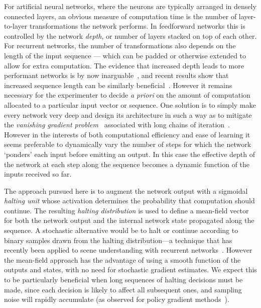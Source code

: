 \documentclass[10pt]{article}
\begin{document}
For artificial neural networks, where the neurons are typically arranged in densely connected layers, an obvious measure of computation time is the number of layer-to-layer transformations the network performs.
In feedforward networks this is controlled by the network \emph{depth}, or number of layers stacked on top of each other.
For recurrent networks, the number of transformations also depends on the length of the input sequence --- which can be padded or otherwise extended to allow for extra computation.
The evidence that increased depth leads to more performant networks is by now inarguable~\cite{dahl2012speech,ciresan2012multicolumn,krizhevsky2012imagenet,graves2013speech}, and recent results show that increased sequence length can be similarly beneficial~\cite{sukhbaatar2015end,vinyals2015order,reed2015npi}.
However it remains necessary for the experimenter to decide \emph{a priori} on the amount of computation allocated to a particular input vector or sequence.
One solution is to simply make every network very deep and design its architecture in such a way as to mitigate the \emph{vanishing gradient problem}~\cite{hochreiter2001gradient} associated with long chains of iteration~\cite{srivastava2015training,kalchbrenner2015grid}.
However in the interests of both computational efficiency and ease of learning it seems preferable to dynamically vary the number of steps for which the network `ponders' each input before emitting an output.
In this case the effective depth of the network at each step along the sequence becomes a dynamic function of the inputs received so far.

The approach pursued here is to augment the network output with a sigmoidal \emph{halting unit} whose activation determines the probability that computation should continue.
The resulting \emph{halting distribution} is used to define a mean-field vector for both the network output and the internal network state propagated along the sequence.
A stochastic alternative would be to halt or continue according to binary samples drawn from the halting distribution---a technique that has recently been applied to scene understanding with recurrent networks~\cite{eslami2016attend}. 
However the mean-field approach has the advantage of using a smooth function of the outputs and states, with no need for stochastic gradient estimates.
We expect this to be particularly beneficial when long sequences of halting decisions must be made, since each decision is likely to affect all subsequent ones, and sampling noise will rapidly accumulate (as observed for policy gradient methods~\cite{williams1995gradient}). 
\end{document}
